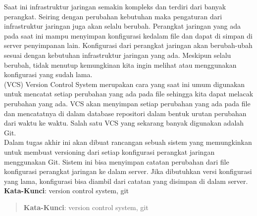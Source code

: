 \begin{abstrak}
        Saat ini infrastruktur jaringan semakin kompleks dan terdiri dari banyak perangkat. Seiring dengan perubahan kebutuhan maka pengaturan dari infrastruktur jaringan juga akan selalu berubah. Perangkat jaringan yang ada pada saat ini mampu menyimpan konfigurasi kedalam file dan dapat di simpan di server penyimpanan lain. Konfigurasi dari perangkat jaringan akan berubah-ubah sesuai dengan kebutuhan infrastruktur jaringan yang ada. Meskipun selalu berubah, tidak menutup kemungkinan kita ingin melihat atau menggunakan konfigurasi yang sudah lama.\\
		\indent (VCS) Version Control System  merupakan cara yang saat ini umum digunakan untuk mencatat setiap perubahan yang ada pada file sehingga kita dapat melacak perubahan yang ada. VCS akan menyimpan setiap perubahan yang ada pada file dan mencatatnya di dalam database repositori dalam bentuk urutan perubahan dari waktu ke waktu. Salah satu VCS yang sekarang banyak digunakan adalah Git.\\
		\indent Dalam tugas akhir ini akan dibuat rancangan sebuah sistem yang memungkinkan untuk membuat versioning dari setiap konfigurasi perangkat jaringan menggunakan Git. Sistem ini bisa menyimpan catatan perubahan dari file konfigurasi perangkat jaringan ke dalam server. Jika dibutuhkan versi konfigurasi yang lama, konfigurasi bisa diambil dari catatan yang disimpan di dalam server.\\

	\noindent \textbf{Kata-Kunci}: version control system, git
\end{abstrak}
\newpage
\begin{abstract}
	

	\noindent \textbf{Kata-Kunci}: version control system, git
\end{abstract}